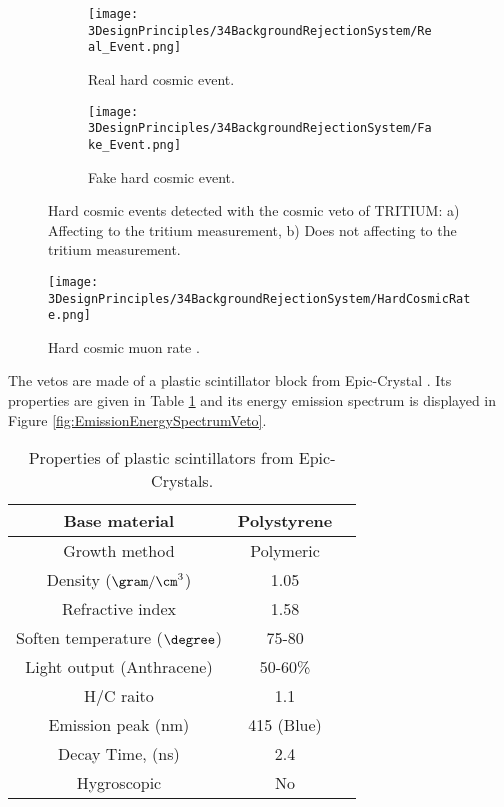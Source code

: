 \begin{figure}
\centering
    \begin{subfigure}[b]{0.45\textwidth}
    \centering
    \texttt{[image: 3DesignPrinciples/34BackgroundRejectionSystem/Real\_Event.png]}  
    \caption{Real hard cosmic event.\label{subfig:RealHardCosmicEvent}}
    \end{subfigure}
    \hfill
    \begin{subfigure}[b]{0.45\textwidth}
    \centering
    \texttt{[image: 3DesignPrinciples/34BackgroundRejectionSystem/Fake\_Event.png]}  
    \caption{Fake hard cosmic event.\label{subfig:FakeHardCosmicEvent}}
    \end{subfigure}
   \caption{Hard cosmic events detected with the cosmic veto of TRITIUM: a) Affecting to the tritium measurement, b) Does not affecting to the tritium measurement.}
 \label{fig:HardCosmicEventsSimulation}
\end{figure}

\begin{figure}[h]
\centering
\texttt{[image: 3DesignPrinciples/34BackgroundRejectionSystem/HardCosmicRate.png]}
\caption{Hard cosmic muon rate \cite{HardCosmicMuonRatePlot}.\label{fig:HardCoscmicRate}}
\end{figure}

The vetos are made of a plastic scintillator block from Epic-Crystal \cite{ScintillatorVeto}. Its properties are given in Table \ref{tab:ParametersScintillatorVeto} and its energy emission spectrum is displayed in Figure \ref{fig:EmissionEnergySpectrumVeto}.

\begin{table}[]
\begin{center}
\begin{tabular}{|c|c|c|}
\hline \hline 
Base material & Polystyrene \\ \hline
Growth method & Polymeric \\ \hline
Density ($\gram/\cm^3$)& 1.05 \\ \hline
Refractive index & 1.58 \\ \hline
Soften temperature ($\degree$) & 75-80 \\ \hline
Light output (Anthracene) & 50-60\% \\ \hline
H/C raito & 1.1 \\ \hline
Emission peak (nm) & 415 (Blue) \\ \hline
Decay Time, (ns) & 2.4 \\ \hline
Hygroscopic & No \\ \hline
\end{tabular}
\caption{Properties of plastic scintillators from Epic-Crystals. \cite{ScintillatorVeto}}
\label{tab:ParametersScintillatorVeto}
\end{center}
\end{table}

